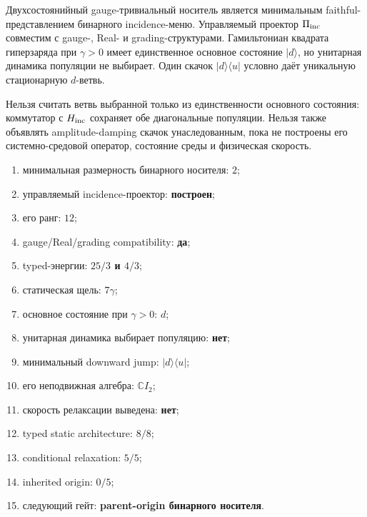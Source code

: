 \begin{theorem}
Двухсостоянийный gauge-тривиальный носитель является минимальным faithful-
представлением бинарного incidence-меню. Управляемый проектор
$\Pi_{\rm inc}$ совместим с gauge-, Real- и grading-структурами.
Гамильтониан квадрата гиперзаряда при $\gamma>0$ имеет единственное основное
состояние $|d\rangle$, но унитарная динамика популяции не выбирает. Один
скачок $|d\rangle\langle u|$ условно даёт уникальную стационарную $d$-ветвь.
\end{theorem}

\begin{nogocriterion}
Нельзя считать ветвь выбранной только из единственности основного состояния:
коммутатор с $H_{\rm inc}$ сохраняет обе диагональные популяции. Нельзя также
объявлять amplitude-damping скачок унаследованным, пока не построены его
системно-средовой оператор, состояние среды и физическая скорость.
\end{nogocriterion}

\begin{protocol}\begin{enumerate}
\item минимальная размерность бинарного носителя: \textbf{$2$};
\item управляемый incidence-проектор: \textbf{построен};
\item его ранг: \textbf{$12$};
\item gauge/Real/grading compatibility: \textbf{да};
\item typed-энергии: \textbf{$25/3$ и $4/3$};
\item статическая щель: \textbf{$7\gamma$};
\item основное состояние при $\gamma>0$: \textbf{$d$};
\item унитарная динамика выбирает популяцию: \textbf{нет};
\item минимальный downward jump: \textbf{$|d\rangle\langle u|$};
\item его неподвижная алгебра: \textbf{$\mathbb CI_2$};
\item скорость релаксации выведена: \textbf{нет};
\item typed static architecture: \textbf{$8/8$};
\item conditional relaxation: \textbf{$5/5$};
\item inherited origin: \textbf{$0/5$};
\item следующий гейт: \textbf{parent-origin бинарного носителя}.
\end{enumerate}\end{protocol}

